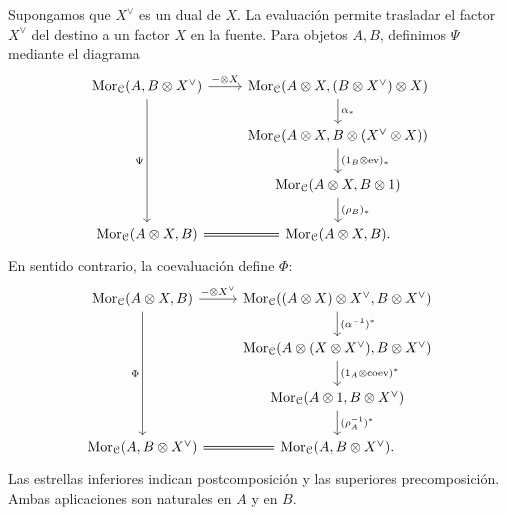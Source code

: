 Supongamos que $X^\vee$ es un dual de $X$. La evaluación permite trasladar el factor $X^\vee$ del destino a un factor $X$ en la fuente. Para objetos $A,B$, definimos $\Psi$ mediante el diagrama
\[
\begin{tikzcd}%
\hom_{\mathcal C}(A,B\otimes X^\vee) \arrow[r,"-\otimes X"] \arrow[ddd,"\Psi"'] & \hom_{\mathcal C}(A\otimes X,(B\otimes X^\vee)\otimes X) \arrow[d,"\alpha_*"]\\
& \hom_{\mathcal C}(A\otimes X,B\otimes(X^\vee\otimes X)) \arrow[d,"(1_B\otimes\mathrm{ev})_*"]\\
& \hom_{\mathcal C}(A\otimes X,B\otimes1) \arrow[d,"(\rho_B)_*"]\\
\hom_{\mathcal C}(A\otimes X,B) \arrow[r,equal] & \hom_{\mathcal C}(A\otimes X,B).
\end{tikzcd}
\]
En sentido contrario, la coevaluación define $\Phi$:
\[
\begin{tikzcd}%
\hom_{\mathcal C}(A\otimes X,B) \arrow[r,"-\otimes X^\vee"] \arrow[ddd,"\Phi"'] & \hom_{\mathcal C}((A\otimes X)\otimes X^\vee,B\otimes X^\vee) \arrow[d,"(\alpha^{-1})^*"]\\
& \hom_{\mathcal C}(A\otimes(X\otimes X^\vee),B\otimes X^\vee) \arrow[d,"(1_A\otimes\mathrm{coev})^*"]\\
& \hom_{\mathcal C}(A\otimes1,B\otimes X^\vee) \arrow[d,"(\rho_A^{-1})^*"]\\
\hom_{\mathcal C}(A,B\otimes X^\vee) \arrow[r,equal] & \hom_{\mathcal C}(A,B\otimes X^\vee).
\end{tikzcd}
\]
Las estrellas inferiores indican postcomposición y las superiores precomposición. Ambas aplicaciones son naturales en $A$ y en $B$.

